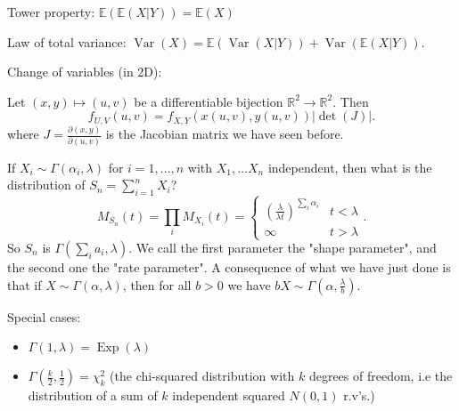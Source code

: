 \documentclass[a4paper]{scrartcl}
\begin{document}
Tower property: $\mathbb{E}(\mathbb{E}(X|Y))=\mathbb{E}(X)$

Law of total variance: $\operatorname{Var}(X)=\mathbb{E}(\operatorname{Var}(X|Y))+\operatorname{Var}(\mathbb{E}(X|Y))$. 

Change of variables (in 2D):

Let $(x,y) \mapsto (u,v)$ be a differentiable bijection $\mathbb{R}^{2} \rightarrow \mathbb{R}^{2} $. Then \[
f_{U,V}(u,v)=f_{X,Y}(x (u,v),y (u,v))|\det (J)|
.\] where $J=\frac{\partial (x,y)}{\partial (u,v)}$ is the Jacobian matrix we have seen before. 

If $X_{i} \sim \Gamma (\alpha_{i}, \lambda)$ for $i=1,\ldots ,n$ with $X_1 , \ldots X_n$ independent, then what is the distribution of $S_{n}=\sum_{i=1}^{n}X_{i}$? \[
M_{S_{n}}(t)=\prod_{i}M_{X_{i}}(t)=
\begin{cases}
    \left(\frac{\lambda}{\lambda t}\right)^{\sum_{i}^{}\alpha_{i}} & t<\lambda\\
    \infty & t>\lambda
\end{cases}
.\]  
So $S_{n}$ is $\Gamma (\sum_{i}^{}a_{i}, \lambda)$. We call the first parameter the "shape parameter", and the second one the "rate parameter". A consequence of what we have just done is that if $X \sim \Gamma (\alpha, \lambda)$, then for all $b>0$ we have $bX \sim \Gamma (\alpha, \frac{\lambda}{b})$. 

Special cases: 
\begin{itemize}
    \item $\Gamma (1, \lambda)=\operatorname{Exp}(\lambda)$ 
    \item $\Gamma \left(\frac{k}{2},\frac{1}{2}\right)=\chi_k^2$ (the chi-squared distribution with $k$ degrees of freedom, i.e the distribution of a sum of $k$ independent squared $N (0,1)$ r.v's.)
\end{itemize}
\end{document}
